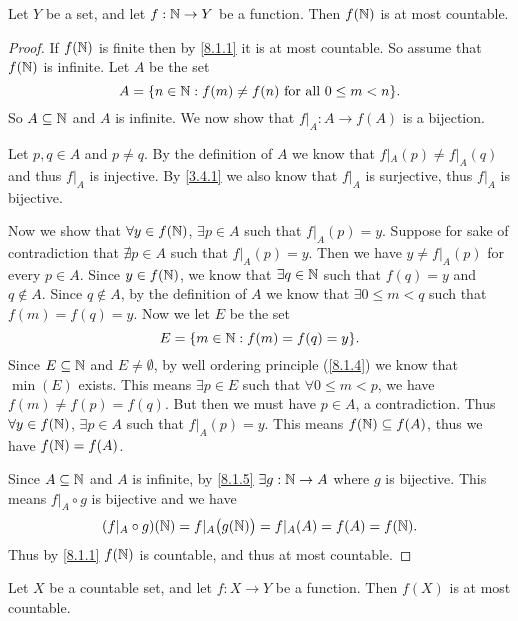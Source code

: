 \begin{prop}\label{8.1.8}
  Let \(Y\) be a set, and let \(f : \mathbb{N} \to Y\) be a function.
  Then \(f(\mathbb{N})\) is at most countable.
\end{prop}

\begin{proof}
  If \(f(\mathbb{N})\) is finite then by \cref{8.1.1} it is at most countable.
  So assume that \(f(\mathbb{N})\) is infinite.
  Let \(A\) be the set
  \[
    A = \set{n \in \N : f(m) \neq f(n) \text{ for all } 0 \leq m < n}.
  \]
  So \(A \subseteq \mathbb{N}\) and \(A\) is infinite.
  We now show that \(f|_A : A \to f(A)\) is a bijection.

  Let \(p, q \in A\) and \(p \neq q\).
  By the definition of \(A\) we know that \(f|_A(p) \neq f|_A(q)\) and thus \(f|_A\) is injective.
  By \cref{3.4.1} we also know that \(f|_A\) is surjective, thus \(f|_A\) is bijective.

  Now we show that \(\forall y \in f(\mathbb{N})\), \(\exists p \in A\) such that \(f|_A(p) = y\).
  Suppose for sake of contradiction that \(\nexists p \in A\) such that \(f|_A(p) = y\).
  Then we have \(y \neq f|_A(p)\) for every \(p \in A\).
  Since \(y \in f(\mathbb{N})\), we know that \(\exists q \in \mathbb{N}\) such that \(f(q) = y\) and \(q \notin A\).
  Since \(q \notin A\), by the definition of \(A\) we know that \(\exists 0 \leq m < q\) such that \(f(m) = f(q) = y\).
  Now we let \(E\) be the set
  \[
    E = \set{m \in \N : f(m) = f(q) = y}.
  \]
  Since \(E \subseteq \mathbb{N}\) and \(E \neq \emptyset\), by well ordering principle (\cref{8.1.4}) we know that \(\min(E)\) exists.
  This means \(\exists p \in E\) such that \(\forall 0 \leq m < p\), we have \(f(m) \neq f(p) = f(q)\).
  But then we must have \(p \in A\), a contradiction.
  Thus \(\forall y \in f(\mathbb{N})\), \(\exists p \in A\) such that \(f|_A(p) = y\).
  This means \(f(\mathbb{N}) \subseteq f(A)\), thus we have \(f(\mathbb{N}) = f(A)\).

  Since \(A \subseteq \mathbb{N}\) and \(A\) is infinite, by \cref{8.1.5} \(\exists g : \mathbb{N} \to A\) where \(g\) is bijective.
  This means \(f|_A \circ g\) is bijective and we have
  \[
    (f|_A \circ g)(\mathbb{N}) = f|_A\big(g(\mathbb{N})\big) = f|_A(A) = f(A) = f(\mathbb{N}).
  \]
  Thus by \cref{8.1.1} \(f(\mathbb{N})\) is countable, and thus at most countable.
\end{proof}

\begin{cor}\label{8.1.9}
  Let \(X\) be a countable set, and let \(f : X \to Y\) be a function.
  Then \(f(X)\) is at most countable.
\end{cor}

